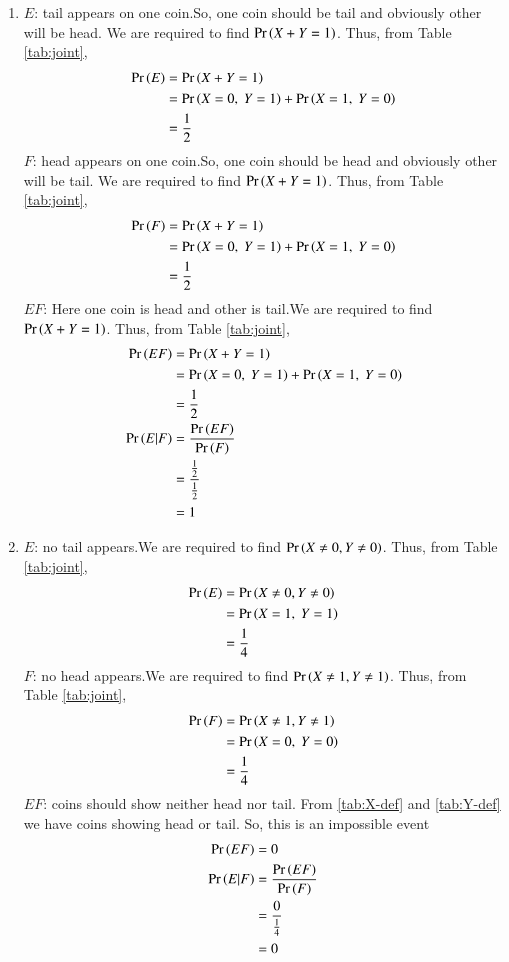 \documentclass[journal,11pt,twocolumn]{IEEEtran}
\begin{document}
    \begin{enumerate}
        \item $E$: tail appears on one coin.So, one coin should be tail and obviously other will be head. We are required to find $\Pr\left(X+Y=1\right)$. Thus, from Table 
        \ref{tab:joint},
        \begin{align}
        \Pr\left(E\right)&=\Pr\left(X+Y=1\right)\\
        &=\Pr\left(X=0,\ Y=1\right)+\Pr\left(X=1,\ Y=0\right)\\
        &=\frac{1}{2}
        \end{align}
        $F$: head appears on one coin.So, one coin should be head and obviously other will be tail. We are required to find $\Pr\left(X+Y=1\right)$. Thus, from Table 
        \ref{tab:joint},
        \begin{align}
        \Pr\left(F\right)&=\Pr\left(X+Y=1\right)\\
        &=\Pr\left(X=0,\ Y=1\right)+\Pr\left(X=1,\ Y=0\right)\\
        &=\frac{1}{2}
        \end{align}
  	$EF$: Here one coin is head and other is tail.We are required to find $\Pr\left(X+Y=1\right)$. Thus, from Table 
        \ref{tab:joint},
\begin{align}
        \Pr\left(EF\right)&=\Pr\left(X+Y=1\right)\\
        &=\Pr\left(X=0,\ Y=1\right)+\Pr\left(X=1,\ Y=0\right)\\
        &=\frac{1}{2}\\
        \Pr\left(E|F\right)&=\frac{\Pr\left(EF\right)}{\Pr\left(F\right)}\\
        &=\frac{\frac{1}{2}}{\frac{1}{2}}\\
        &=1
\end{align}
\item $E$: no tail appears.We are required to find $\Pr\left(X\neq0,Y\neq0\right)$. Thus, from Table 
\ref{tab:joint},
\begin{align}
\Pr\left(E\right)&=\Pr\left(X\neq0,Y\neq0\right)\\
&=\Pr\left(X=1,\ Y=1\right)\\
&=\frac{1}{4}
        \end{align}
        $F$: no head appears.We are required to find $\Pr\left(X\neq1,Y\neq1\right)$. Thus, from Table 
        \ref{tab:joint},
        \begin{align}
        \Pr\left(F\right)&=\Pr\left(X\neq1,Y\neq1\right)\\
        &=\Pr\left(X=0,\ Y=0\right)\\
        &=\frac{1}{4}
\end{align}
$EF$: coins should show neither head nor tail. From \ref{tab:X-def} and \ref{tab:Y-def} we have coins showing head or tail. So, this is an impossible event
\begin{align}
\Pr\left(EF\right)&=0\\
\Pr\left(E|F\right)&=\frac{\Pr\left(EF\right)}{\Pr\left(F\right)}\\
&=\frac{0}{\frac{1}{4}}\\
&=0
\end{align}
        
        
     
    \end{enumerate}
\end{document}
